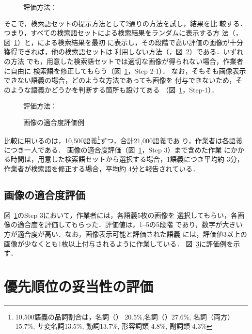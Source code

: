 \documentclass[japanese]{jnlp_1.4}
\newcommand{\izs}[1]{}
\newcommand{\best}{}
\newcommand{\evaB}{}
\newcommand{\evaR}{}
\begin{document}
\begin{figure}[b]

\caption{評価方法：\evaR{}}
\label{tb:eva-method-rand}
\vspace{-1\Cvs}
\end{figure}

そこで，検索語セットの提示方法として2通りの方法を試し，結果を比
較する．つまり，すべての検索語セットによる検索結果をランダムに表示する方
法（\evaR{}，図~\ref{tb:eva-method-rand}）と，\best{}による検索結果を最初
に表示し，その段階で高い評価の画像が十分獲得できれば，他の検索語セットは
利用しない方法（\evaB{}，図~\ref{tb:eva-method-best}）である．いずれの方法
でも，用意した検索語セットでは適切な画像が得られない場合，作業者に自由に
検索語を修正してもらう（図~\ref{tb:eva-method-rand}，Step 2-1）．
なお，そもそも画像表示できない語義の場合，どのような方法であっても画像を
付与できないため，そのような語義かどうかを判断する箇所も設けてある
（図~\ref{tb:eva-method-rand}，Step-1）．

\begin{figure}[b]

\caption{評価方法：\evaB{}}
\label{tb:eva-method-best}
\end{figure}
\begin{figure}[b]

\caption{画像の適合度評価例}
\label{tb:eva-ex}
\end{figure}

比較に用いるのは，10,500語義\footnote{10,500語義の品詞割合は，名詞（\izs{2:具体}）
20.5\%,名詞（\izs{1000:抽象}）27.6\%, 名詞（両方）15.7\%, サ変名詞13.5\%, 動詞13.7\%, 形容詞類 4.8\%, 副詞類 4.3\%}ずつ，合計21,000語義であ
り，作業者は各語義につき一人である．
画像の適合度評価（図~\ref{tb:eva-method-rand}，Step 3）まで含めた作業
にかかる時間は，用意した検索語セットから選択する場合，1語義につき平均約
3分，作業者が検索語を修正する場合，平均約 4分と報告されている．


\subsection{画像の適合度評価}
\label{sec:exp-eva}

図~\ref{tb:eva-method-rand}のStep 3において，作業者には，各語義5枚の画像を
選択してもらい，各画像の適合度を評価してもらった．評価値は，1--5の5段階
であり，数字が大きい方が適合度が高い．なお，画像表示可能と評価された語義
には，評価値3以上の画像が少なくとも1枚以上付与されるように作業している．
図~\ref{tb:eva-ex}に評価例を示す．


\section{優先順位の妥当性の評価}
\label{sec:ana-rand-best}
\end{document}
